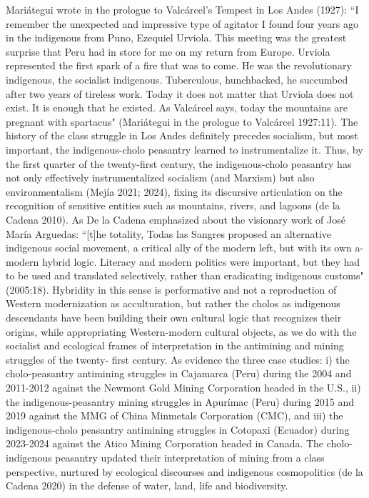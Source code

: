 \documentclass[]{interact}
\theoremstyle{plain}%
\theoremstyle{definition}
\theoremstyle{remark}
\begin{document}
Mariátegui wrote in the prologue to Valcárcel's Tempest in Los Andes (1927): “I remember the unexpected and impressive type of agitator I found four years ago in the indigenous from Puno, Ezequiel Urviola. This meeting was the greatest surprise that Peru had in store for me on my return from Europe. Urviola represented the first spark of a fire that was to come. He was the revolutionary indigenous, the socialist indigenous. Tuberculous, hunchbacked, he succumbed after two years of tireless work. Today it does not matter that Urviola does not exist. It is enough that he existed. As Valcárcel says, today the mountains are pregnant with spartacus" (Mariátegui in the prologue to Valcárcel 1927:11).
The history of the class struggle in Los Andes definitely precedes socialism, but most important, the indigenous-cholo peasantry learned to instrumentalize it. Thus, by the first quarter of the twenty-first century, the indigenous-cholo peasantry has not only effectively instrumentalized socialism (and Marxism) but also environmentalism (Mejía 2021; 2024), fixing its discursive articulation on the recognition of sensitive entities such as mountains, rivers, and lagoons (de la Cadena 2010). As De la Cadena emphasized about the visionary work of José María Arguedas: “[t]he totality, Todas las Sangres proposed an alternative indigenous social movement, a critical ally of the modern left, but with its own a-modern hybrid logic. Literacy and modern politics were important, but they had to be used and translated selectively, rather than eradicating indigenous customs" (2005:18).
Hybridity in this sense is performative and not a reproduction of Western modernization as acculturation, but rather the cholos as indigenous descendants have been building their own cultural logic that recognizes their origins, while appropriating Western-modern cultural objects, as we do with the socialist and ecological frames of interpretation in the antimining and mining struggles of the twenty- first century. As evidence the three case studies: i) the cholo-peasantry antimining struggles in Cajamarca (Peru) during the 2004 and 2011-2012 against the Newmont Gold Mining Corporation headed in the U.S., ii) the indigenous-peasantry mining struggles in Apurímac (Peru) during 2015 and 2019 against the MMG of China Minmetals Corporation (CMC), and iii) the indigenous-cholo peasantry antimining struggles in Cotopaxi (Ecuador) during 2023-2024 against the Atico Mining Corporation headed in Canada. The cholo-indigenous peasantry updated their interpretation of mining from a class perspective, nurtured by ecological discourses and indigenous cosmopolitics (de la Cadena 2020) in the defense of water, land, life and biodiversity.
\end{document}
